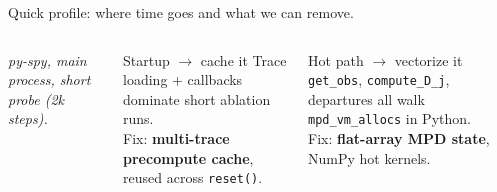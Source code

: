 \documentclass[11pt,aspectratio=43]{beamer}
\begin{document}
\begin{frame}{Quick profile: where time goes and what we can remove.}
\begin{columns}[T,onlytextwidth]
      \begin{center}
        \scriptsize \textit{py-spy, main process, short probe (2k steps).}
      \end{center}

      \begin{block}{Startup $\rightarrow$ cache it}
        \small
        Trace loading + callbacks dominate short ablation runs.\\
        Fix: \textbf{multi-trace precompute cache}, reused across \texttt{reset()}.
      \end{block}

      \vspace{0.4em}
      \begin{block}{Hot path $\rightarrow$ vectorize it}
        \small
        \texttt{get\_obs}, \texttt{compute\_D\_j}, departures all walk \texttt{mpd\_vm\_allocs} in Python.\\
        Fix: \textbf{flat-array MPD state}, NumPy hot kernels.
      \end{block}
  \end{columns}

\end{frame}

\end{document}
